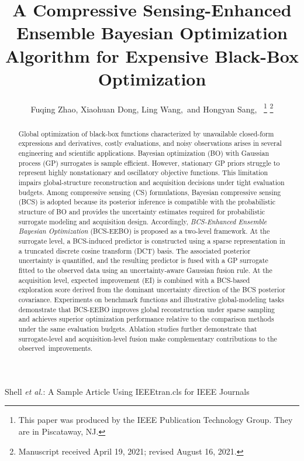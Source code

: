 \documentclass[lettersize,journal]{IEEEtran}
\begin{document}
\title{A Compressive Sensing-Enhanced Ensemble Bayesian Optimization Algorithm for Expensive Black-Box Optimization}

\author{Fuqing Zhao, Xiaohuan Dong, Ling Wang,~and Hongyan Sang,~
\thanks{This paper was produced by the IEEE Publication Technology Group. They are in Piscataway, NJ.}%
\thanks{Manuscript received April 19, 2021; revised August 16, 2021.}}

%
{Shell \MakeLowercase{\textit{et al.}}: A Sample Article Using IEEEtran.cls for IEEE Journals}

\maketitle

\begin{abstract}
Global optimization of black-box functions characterized by unavailable closed-form expressions and derivatives, costly evaluations, and noisy observations arises in several engineering and scientific applications. Bayesian optimization (BO) with Gaussian process (GP) surrogates is sample efficient. However, stationary GP priors struggle to represent highly nonstationary and oscillatory objective functions. This limitation impairs global-structure reconstruction and acquisition decisions under tight evaluation budgets. Among compressive sensing (CS) formulations, Bayesian compressive sensing (BCS) is adopted because its posterior inference is compatible with the probabilistic structure of BO and provides the uncertainty estimates required for probabilistic surrogate modeling and acquisition design. Accordingly, \emph{BCS-Enhanced Ensemble Bayesian Optimization} (BCS-EEBO) is proposed as a two-level framework. At the surrogate level, a BCS-induced predictor is constructed using a sparse representation in a truncated discrete cosine transform (DCT) basis. The associated posterior uncertainty is quantified, and the resulting predictor is fused with a GP surrogate fitted to the observed data using an uncertainty-aware Gaussian fusion rule. At the acquisition level, expected improvement (EI) is combined with a BCS-based exploration score derived from the dominant uncertainty direction of the BCS posterior covariance. Experiments on benchmark functions and illustrative global-modeling tasks demonstrate that BCS-EEBO improves global reconstruction under sparse sampling and achieves superior optimization performance relative to the comparison methods under the same evaluation budgets. Ablation studies further demonstrate that surrogate-level and acquisition-level fusion make complementary contributions to the observed~improvements.
\end{abstract}
\end{document}
